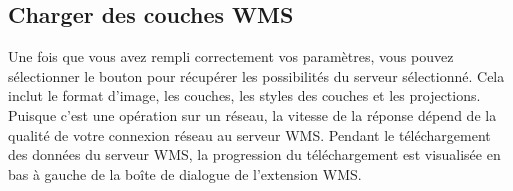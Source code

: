 

\subsection{Charger des couches WMS}\label{sec:ogc-wms-layers}

Une fois que vous avez rempli correctement vos paramètres, vous pouvez
sélectionner le bouton  pour récupérer les possibilités du
serveur sélectionné. Cela inclut le format d'image, les couches, les styles des
couches et les projections. Puisque c'est une opération sur un réseau, la
vitesse de la réponse dépend de la qualité de votre connexion réseau au
serveur WMS. Pendant le téléchargement des données du serveur WMS, la
progression du téléchargement est visualisée en bas à gauche de la boîte de
dialogue de l'extension WMS.

